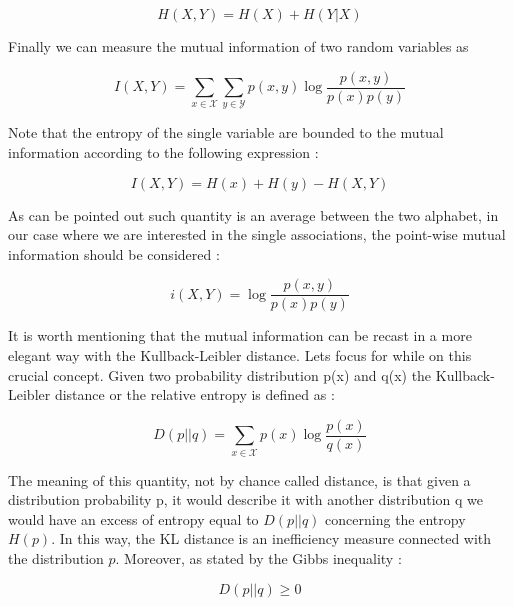 \documentclass[12pt,%
               a4paper,%
               oneside,openany,%
               titlepage,%
               headinclude,footinclude,%
               BCOR5mm,%
               cleardoublepage=empty,%
               tablecaptionabove,%
               floatperchapter,
               ]{scrreprt}                 %
\begin{document}
\begin{equation}
H(X,Y)=H(X)+H(Y|X)
\end{equation}

Finally we can measure the mutual information of two random variables as

\begin{equation}
I(X,Y)=\sum_{x \in \mathcal{X}}\sum_{y \in \mathcal{Y}} p(x,y)\log \frac{p(x,y)}{p(x)p(y)}
\end{equation}

Note that the entropy of the single variable are bounded to the mutual information according to the following expression \cite{cover2006elements}:

\begin{equation}
I(X,Y)=H(x)+H(y)-H(X,Y)
\end{equation}

 As can be pointed out such quantity is an average between the two alphabet, in our case where we are interested in the single associations, the point-wise mutual information should be considered \cite{cover2006elements}:

\begin{equation}
i(X,Y)=\log \frac{p(x,y)}{p(x)p(y)}
\end{equation}

It is worth mentioning that the mutual information can be recast in a more elegant  way with the Kullback-Leibler distance. Lets focus for while on this crucial concept. Given two probability distribution p(x) and q(x) the Kullback-Leibler distance or the relative entropy is defined as \cite{cover2006elements}:

\begin{equation}
D(p||q)=\sum_{x \in \mathcal{X}} p(x)\log \frac{p(x)}{q(x)}
\end{equation}

The meaning of this quantity, not by chance called distance, is that given a distribution probability p, it would describe it with another distribution q we would have an excess of entropy equal to $D(p||q)$ concerning the entropy $H(p)$. In this way, the KL distance is an inefficiency measure connected with the distribution $p$. Moreover, as stated by the Gibbs inequality \cite{mackay2003information}:

\begin{equation}
D(p||q)\geq 0
\end{equation}
\end{document}
